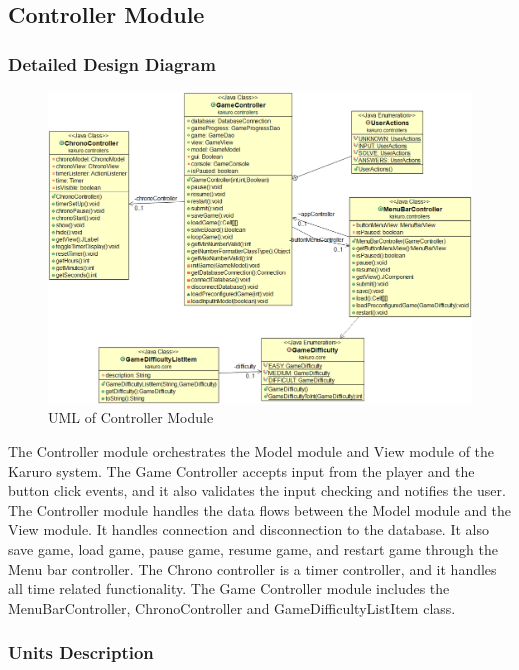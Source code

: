 \documentclass[12pt]{article}
\begin{document}
\newpage

\subsection{Controller Module}

\subsubsection{Detailed Design Diagram}


\begin{figure}[htbp]
    \includegraphics[width=1\textwidth]{images/Controller_UML.png}
    \caption{UML of Controller Module}
    \label{fig:Controller_UML}
\end{figure}

The Controller module orchestrates the Model module and View module of the Karuro system. The Game Controller accepts input from the player and the button click events, and it also validates the input checking and notifies the user. The Controller module handles the data flows between the Model module and the View module. It handles connection and disconnection to the database. It also save game, load game, pause game, resume game, and restart game through the Menu bar controller. The Chrono controller is a timer controller, and it handles all time related functionality. The Game Controller module includes the MenuBarController, ChronoController and GameDifficultyListItem class.

\subsubsection{Units Description}
\end{document}
